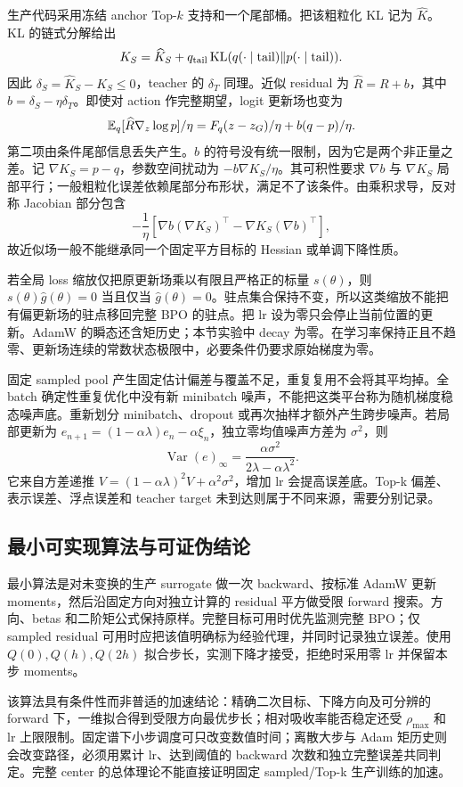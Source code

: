 生产代码采用冻结 anchor Top-$k$ 支持和一个尾部桶。把该粗粒化 KL 记为 $\widehat K$。KL 的链式分解给出
\begin{equation}
K_S=\widehat K_S+q_{\mathrm{tail}}\operatorname{KL}(q(\cdot\mid\mathrm{tail})\Vert p(\cdot\mid\mathrm{tail})).
\end{equation}
因此 $\delta_S=\widehat K_S-K_S\le0$，teacher 的 $\delta_T$ 同理。近似 residual 为 $\widehat R=R+b$，其中 $b=\delta_S-\eta\delta_T$。即使对 action 作完整期望，logit 更新场也变为
\begin{equation}
\mathbb E_q[\widehat R\nabla_z\log p]/\eta
=F_q(z-z_G)/\eta+b(q-p)/\eta.
\end{equation}
第二项由条件尾部信息丢失产生。$b$ 的符号没有统一限制，因为它是两个非正量之差。记 $\nabla K_S=p-q$，参数空间扰动为 $-b\nabla K_S/\eta$。其可积性要求 $\nabla b$ 与 $\nabla K_S$ 局部平行；一般粗粒化误差依赖尾部分布形状，满足不了该条件。由乘积求导，反对称 Jacobian 部分包含
\begin{equation}
-\frac1\eta\left[\nabla b(\nabla K_S)^\top-
\nabla K_S(\nabla b)^\top\right],
\end{equation}
故近似场一般不能继承同一个固定平方目标的 Hessian 或单调下降性质。

若全局 loss 缩放仅把原更新场乘以有限且严格正的标量 $s(\theta)$，则 $s(\theta)\widehat g(\theta)=0$ 当且仅当 $\widehat g(\theta)=0$。驻点集合保持不变，所以这类缩放不能把有偏更新场的驻点移回完整 BPO 的驻点。把 lr 设为零只会停止当前位置的更新。AdamW 的瞬态还含矩历史；本节实验中 decay 为零。在学习率保持正且不趋零、更新场连续的常数状态极限中，必要条件仍要求原始梯度为零。

固定 sampled pool 产生固定估计偏差与覆盖不足，重复复用不会将其平均掉。全 batch 确定性重复优化中没有新 minibatch 噪声，不能把这类平台称为随机梯度稳态噪声底。重新划分 minibatch、dropout 或再次抽样才额外产生跨步噪声。若局部更新为 $e_{n+1}=(1-\alpha\lambda)e_n-\alpha\xi_n$，独立零均值噪声方差为 $\sigma^2$，则
\begin{equation}
\operatorname{Var}(e)_\infty=\frac{\alpha\sigma^2}{2\lambda-\alpha\lambda^2}.
\end{equation}
它来自方差递推 $V=(1-\alpha\lambda)^2V+\alpha^2\sigma^2$，增加 lr 会提高误差底。Top-k 偏差、表示误差、浮点误差和 teacher target 未到达则属于不同来源，需要分别记录。

\subsection{最小可实现算法与可证伪结论}

最小算法是对未变换的生产 surrogate 做一次 backward、按标准 AdamW 更新 moments，然后沿固定方向对独立计算的 residual 平方做受限 forward 搜索。方向、betas 和二阶矩公式保持原样。完整目标可用时优先监测完整 BPO；仅 sampled residual 可用时应把该值明确标为经验代理，并同时记录独立误差。使用 $Q(0),Q(h),Q(2h)$ 拟合步长，实测下降才接受，拒绝时采用零 lr 并保留本步 moments。

该算法具有条件性而非普适的加速结论：精确二次目标、下降方向及可分辨的 forward 下，一维拟合得到受限方向最优步长；相对吸收率能否稳定还受 $\rho_{\max}$ 和 lr 上限限制。固定谱下小步调度可只改变数值时间；离散大步与 Adam 矩历史则会改变路径，必须用累计 lr、达到阈值的 backward 次数和独立完整误差共同判定。完整 center 的总体理论不能直接证明固定 sampled/Top-k 生产训练的加速。
